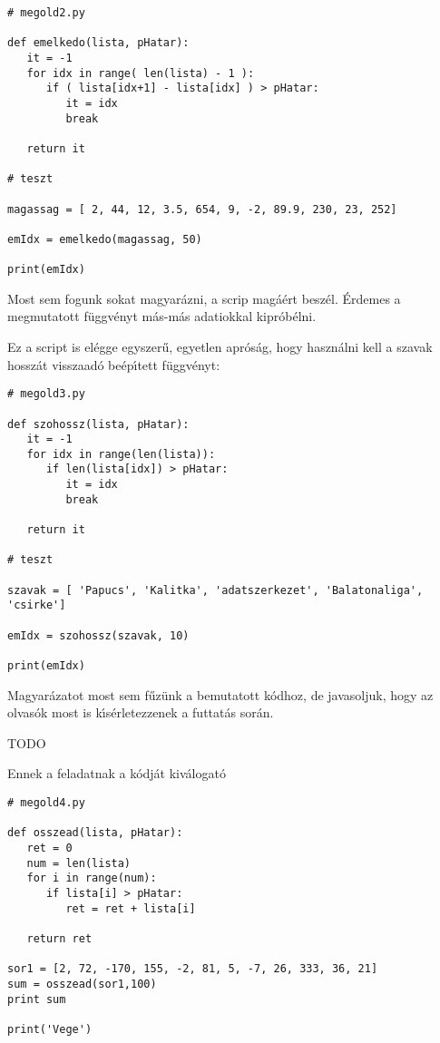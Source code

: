 \begin{Verbatim}[fontsize=\small]
# megold2.py

def emelkedo(lista, pHatar):
   it = -1
   for idx in range( len(lista) - 1 ):
      if ( lista[idx+1] - lista[idx] ) > pHatar:
      	 it = idx
      	 break

   return it

# teszt

magassag = [ 2, 44, 12, 3.5, 654, 9, -2, 89.9, 230, 23, 252]

emIdx = emelkedo(magassag, 50)

print(emIdx)
\end{Verbatim}

Most sem fogunk sokat magyar\'azni, a scrip mag\'a\'ert besz\'el. \'Erdemes a megmutatott f\"uggv\'enyt 
m\'as-m\'as adatiokkal kipr\'ob\'elni.

\themegold

Ez a script is el\'egge egyszer\H{u}, egyetlen apr\'os\'ag, hogy haszn\'alni kell a szavak hossz\'at
visszaad\'o be\'ep\'{\i}tett f\"uggv\'enyt:

\begin{Verbatim}[fontsize=\small]
# megold3.py

def szohossz(lista, pHatar):
   it = -1
   for idx in range(len(lista)):
      if len(lista[idx]) > pHatar:
      	 it = idx
      	 break

   return it

# teszt

szavak = [ 'Papucs', 'Kalitka', 'adatszerkezet', 'Balatonaliga', 'csirke']

emIdx = szohossz(szavak, 10)

print(emIdx)
\end{Verbatim}

Magyar\'azatot most sem f\H{u}z\"unk a bemutatott k\'odhoz, de javasoljuk, hogy az olvas\'ok most is k\'{\i}s\'erletezzenek 
a futtat\'as sor\'an.

TODO

\themegold

Ennek a feladatnak a k\'odj\'at kiv\'alogat\'o 

\begin{Verbatim}[fontsize=\small]
# megold4.py

def osszead(lista, pHatar):
   ret = 0
   num = len(lista)
   for i in range(num):
      if lista[i] > pHatar:
         ret = ret + lista[i] 

   return ret

sor1 = [2, 72, -170, 155, -2, 81, 5, -7, 26, 333, 36, 21]
sum = osszead(sor1,100)
print sum

print('Vege')  
\end{Verbatim}

